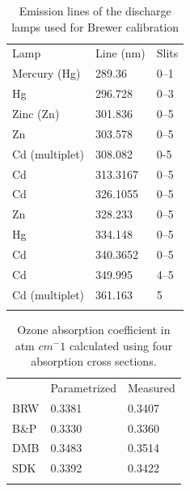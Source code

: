 \documentclass[acp, manuscript]{copernicus}
\begin{document}









\begin{table}[t]
\caption{Emission lines of the discharge lamps used for Brewer calibration}
\begin{tabular}{lll}
\tophline
Lamp           & Line (nm) & Slits \\
\middlehline
Mercury (Hg)   & 289.36    & 0–1   \\
Hg             & 296.728   & 0–3   \\
Zinc (Zn)      & 301.836   & 0–5   \\
Zn             & 303.578   & 0–5   \\
Cd (multiplet) & 308.082   & 0-5   \\
Cd             & 313.3167  & 0–5   \\
Cd             & 326.1055  & 0–5   \\
Zn             & 328.233   & 0–5   \\
Hg             & 334.148   & 0–5   \\
Cd             & 340.3652  & 0–5   \\
Cd             & 349.995   & 4–5   \\
Cd (multiplet) & 361.163   & 5     \\
\bottomhline
\end{tabular}
\belowtable{} %
\label{tab:dsp_lines}
\end{table}



\begin{table}[t]
\caption{Ozone absorption coefficient in atm $cm^-1$ calculated using four absorption cross sections.}
\begin{tabular}{lll}
\tophline
     & Parametrized & Measured \\
\middlehline
BRW  & 0.3381       & 0.3407   \\
B\&P & 0.3330       & 0.3360    \\
DMB  & 0.3483       & 0.3514   \\
SDK  & 0.3392       & 0.3422    \\
\bottomhline
\end{tabular}
\belowtable{} %
\label{tab:slit_param}
\end{table}
\end{document}
